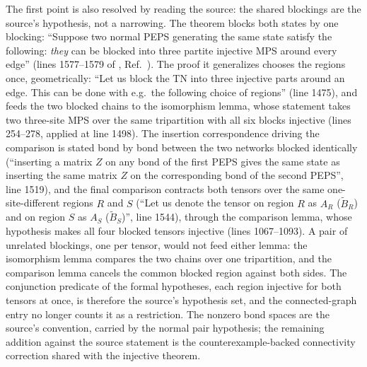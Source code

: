 \documentclass{article}
\begin{document}
The first point is also resolved by reading the source: the shared blockings
are the source's hypothesis, not a narrowing.  The theorem blocks both
states by one blocking: ``Suppose two normal PEPS generating the same state
satisfy the following: \emph{they} can be blocked into three partite
injective MPS around every edge'' (lines 1577--1579 of
, Ref.~\cite{Molnar2018NormalPEPS}).  The proof it generalizes
chooses the regions once, geometrically: ``Let us block the TN into three
injective parts around an edge.  This can be done with e.g.\ the following
choice of regions'' (line 1475), and feeds the two blocked chains to the
isomorphism lemma, whose statement takes two three-site MPS over the same
tripartition with all six blocks injective (lines 254--278, applied at line
1498).  The insertion correspondence driving the comparison is stated bond
by bond between the two networks blocked identically (``inserting a matrix
$Z$ on any bond of the first PEPS gives the same state as inserting the same
matrix $Z$ on the corresponding bond of the second PEPS'', line 1519), and
the final comparison contracts both tensors over the same
one-site-different regions $R$ and $S$ (``Let us denote the tensor on region
$R$ as $A_R$ ($\tilde{B}_R$) and on region $S$ as $A_S$ ($\tilde{B}_S$)'',
line 1544), through the comparison lemma, whose hypothesis makes all four
blocked tensors injective (lines 1067--1093).  A pair of unrelated
blockings, one per tensor, would not feed either lemma: the isomorphism
lemma compares the two chains over one tripartition, and the comparison
lemma cancels the common blocked region against both sides.  The conjunction
predicate of the formal hypotheses, each region injective for both tensors
at once, is therefore the source's hypothesis set, and the connected-graph
entry  no longer counts it
as a restriction. The nonzero bond spaces are the source's convention,
carried by the normal pair hypothesis; the remaining addition against the
source statement is the counterexample-backed connectivity correction shared
with the injective theorem.
\end{document}
